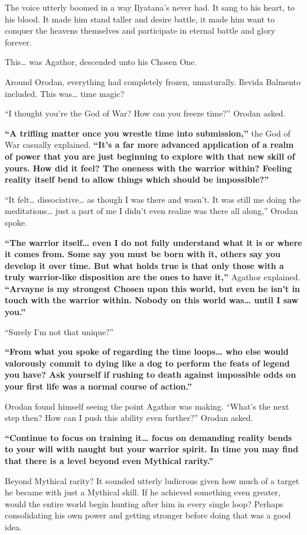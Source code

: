 \documentclass[a4paper,10pt]{book}
\begin{document}
The voice utterly boomed in a way Ilyatana’s never had. It sang to his heart, to his blood. It made him stand taller and desire battle, it made him want to conquer the heavens themselves and participate in eternal battle and glory forever.\par
This… was Agathor, descended unto his Chosen One.\par
Around Orodan, everything had completely frozen, unnaturally. Ilevida Balmento included. This was… time magic?\par
“I thought you’re the God of War? How can you freeze time?” Orodan asked.\par
\textbf{“A trifling matter once you wrestle time into submission,” }the God of War casually explained. \textbf{“It’s a far more advanced application of a realm of power that you are just beginning to explore with that new skill of yours. How did it feel? The oneness with the warrior within? Feeling reality itself bend to allow things which should be impossible?”}\par
“It felt… dissociative… as though I was there and wasn’t. It was still me doing the meditations… just a part of me I didn’t even realize was there all along,” Orodan spoke.\par
\textbf{“The warrior itself… even I do not fully understand what it is or where it comes from. Some say you must be born with it, others say you develop it over time. But what holds true is that only those with a truly warrior-like disposition are the ones to have it,” }Agathor explained. \textbf{“Arvayne is my strongest Chosen upon this world, but even he isn’t in touch with the warrior within. Nobody on this world was… until I saw you.”}\par
“Surely I’m not that unique?”\par
\textbf{“From what you spoke of regarding the time loops… who else would valorously commit to dying like a dog to perform the feats of legend you have? Ask yourself if rushing to death against impossible odds on your first life was a normal course of action.”}\par
Orodan found himself seeing the point Agathor was making. “What’s the next step then? How can I push this ability even further?” Orodan asked.\par
\textbf{“Continue to focus on training it… focus on demanding reality bends to your will with naught but your warrior spirit. In time you may find that there is a level beyond even Mythical rarity.”}\par
Beyond Mythical rarity? It sounded utterly ludicrous given how much of a target he became with just a Mythical skill. If he achieved something even greater, would the entire world begin hunting after him in every single loop? Perhaps consolidating his own power and getting stronger before doing that was a good idea.\par
\end{document}
